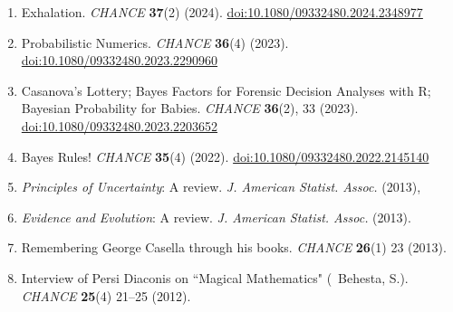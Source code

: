 \begin{enumerate}
\item Exhalation. {\em CHANCE} {\bf 37}(2) (2024).
\href{https://doi.org/10.1080/09332480.2024.2348977}{doi:10.1080/09332480.2024.2348977}

\item Probabilistic Numerics. {\em CHANCE} {\bf 36}(4) (2023).
\href{https://doi.org/10.1080/09332480.2023.2290960}{doi:10.1080/09332480.2023.2290960}

\item Casanova's Lottery; Bayes Factors for Forensic Decision Analyses with R; Bayesian Probability for Babies. {\em CHANCE} {\bf 36}(2), 33 (2023).
\href{https://doi.org/10.1080/09332480.2023.2203652}{doi:10.1080/09332480.2023.2203652}

\item Bayes Rules! {\em CHANCE} {\bf 35}(4) (2022).
\href{https://doi.org/10.1080/09332480.2022.2145140}{doi:10.1080/09332480.2022.2145140}








\item {\em Principles of Uncertainty}: A review. {\em J. American Statist. Assoc.} (2013),

\item {\em Evidence and Evolution}: A review. {\em J. American Statist. Assoc.} (2013).

\item Remembering George Casella through his books. {\em CHANCE} {\bf 26}(1) 23 (2013).

\item Interview of Persi Diaconis on ``Magical Mathematics" (\avec~Behesta, S.). {\em CHANCE} 
{\bf 25}(4) 21--25 (2012).


\end{enumerate}
